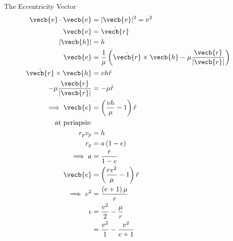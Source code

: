 \begin{hwkProblem}{1}{The Eccentricity Vector}
	\begin{align*}
		\vecb{v} \cdot \vecb{v}           & = |\vecb{v}|^{2} = v^{2}                                                                       \\
		\vecb{v}                          & = \dot{\vecb{r}}                                                                               \\
		|\vecb{h}|                        & = h                                                                                            \\
		\vecb{e}                          & = \frac{1}{\mu} \left(\dot{\vecb{r}} \times \vecb{h} - \mu \frac{\vecb{r}}{|\vecb{r}|} \right) \\
		\dot{\vecb{r}} \times \vecb{h}    & = v h \hat{r}                                                                                  \\
		- \mu \frac{\vecb{r}}{|\vecb{r}|} & = - \mu \hat{r}                                                                                \\
		\implies \vecb{e}                 & = \left(\frac{v h}{\mu} - 1\right) \hat{r}                                                     \\
		\text{at periapsis:}              & \,                                                                                             \\
		r_{p} v_{p}                       & = h                                                                                            \\
		r_{p}                             & = a \left(1 - e\right)                                                                         \\
		\implies a                        & = \frac{r}{1-e}                                                                                \\
		\vecb{e}                          & = \left(\frac{r v^{2}}{\mu} - 1\right) \hat{r}                                                 \\
		\implies v^{2}                    & = \frac{\left(e + 1\right)\mu}{r}                                                              \\
		\epsilon                          & = \frac{v^{2}}{2} - \frac{\mu}{r}                                                              \\
		\,                                & = \frac{v^{2}}{1} - \frac{v^{2}}{e + 1}                                                        \\

\end{align*}
\end{hwkProblem}
